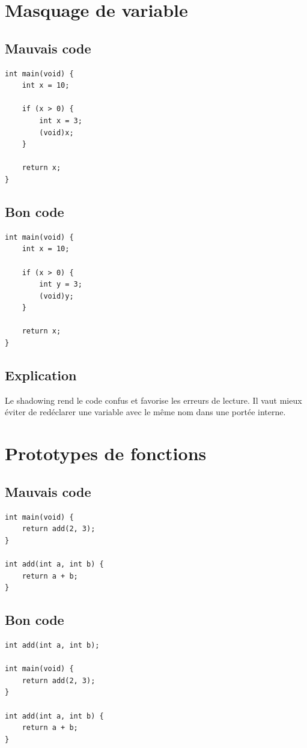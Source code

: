 \documentclass[a4paper,11pt]{report}
\begin{document}
\chapter{Masquage de variable}

\section{Mauvais code}
\begin{lstlisting}
int main(void) {
    int x = 10;

    if (x > 0) {
        int x = 3;
        (void)x;
    }

    return x;
}
\end{lstlisting}

\section{Bon code}
\begin{lstlisting}
int main(void) {
    int x = 10;

    if (x > 0) {
        int y = 3;
        (void)y;
    }

    return x;
}
\end{lstlisting}

\section{Explication}
Le shadowing rend le code confus et favorise les erreurs de lecture.
Il vaut mieux éviter de redéclarer une variable avec le même nom dans une portée interne.

\chapter{Prototypes de fonctions}

\section{Mauvais code}
\begin{lstlisting}
int main(void) {
    return add(2, 3);
}

int add(int a, int b) {
    return a + b;
}
\end{lstlisting}

\section{Bon code}
\begin{lstlisting}
int add(int a, int b);

int main(void) {
    return add(2, 3);
}

int add(int a, int b) {
    return a + b;
}
\end{lstlisting}
\end{document}
